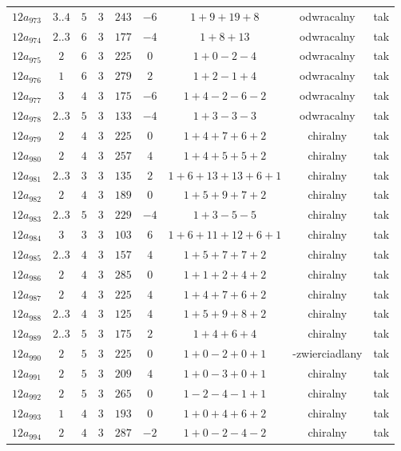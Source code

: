 \begin{longtable}{ccccccccc}
$12a_{973}$ & $3..4$ & $5$ & $3$ & $243$ & $-6$ & $1+9+19+8$ & odwracalny & tak \\
$12a_{974}$ & $2..3$ & $6$ & $3$ & $177$ & $-4$ & $1+8+13$ & odwracalny & tak \\
$12a_{975}$ & $2$ & $6$ & $3$ & $225$ & $0$ & $1+0-2-4$ & odwracalny & tak \\
$12a_{976}$ & $1$ & $6$ & $3$ & $279$ & $2$ & $1+2-1+4$ & odwracalny & tak \\
$12a_{977}$ & $3$ & $4$ & $3$ & $175$ & $-6$ & $1+4-2-6-2$ & odwracalny & tak \\
$12a_{978}$ & $2..3$ & $5$ & $3$ & $133$ & $-4$ & $1+3-3-3$ & odwracalny & tak \\
$12a_{979}$ & $2$ & $4$ & $3$ & $225$ & $0$ & $1+4+7+6+2$ & chiralny & tak \\
$12a_{980}$ & $2$ & $4$ & $3$ & $257$ & $4$ & $1+4+5+5+2$ & chiralny & tak \\
$12a_{981}$ & $2..3$ & $3$ & $3$ & $135$ & $2$ & $1+6+13+13+6+1$ & chiralny & tak \\
$12a_{982}$ & $2$ & $4$ & $3$ & $189$ & $0$ & $1+5+9+7+2$ & chiralny & tak \\
$12a_{983}$ & $2..3$ & $5$ & $3$ & $229$ & $-4$ & $1+3-5-5$ & chiralny & tak \\
$12a_{984}$ & $3$ & $3$ & $3$ & $103$ & $6$ & $1+6+11+12+6+1$ & chiralny & tak \\
$12a_{985}$ & $2..3$ & $4$ & $3$ & $157$ & $4$ & $1+5+7+7+2$ & chiralny & tak \\
$12a_{986}$ & $2$ & $4$ & $3$ & $285$ & $0$ & $1+1+2+4+2$ & chiralny & tak \\
$12a_{987}$ & $2$ & $4$ & $3$ & $225$ & $4$ & $1+4+7+6+2$ & chiralny & tak \\
$12a_{988}$ & $2..3$ & $4$ & $3$ & $125$ & $4$ & $1+5+9+8+2$ & chiralny & tak \\
$12a_{989}$ & $2..3$ & $5$ & $3$ & $175$ & $2$ & $1+4+6+4$ & chiralny & tak \\
$12a_{990}$ & $2$ & $5$ & $3$ & $225$ & $0$ & $1+0-2+0+1$ & -zwierciadlany & tak \\
$12a_{991}$ & $2$ & $5$ & $3$ & $209$ & $4$ & $1+0-3+0+1$ & chiralny & tak \\
$12a_{992}$ & $2$ & $5$ & $3$ & $265$ & $0$ & $1-2-4-1+1$ & chiralny & tak \\
$12a_{993}$ & $1$ & $4$ & $3$ & $193$ & $0$ & $1+0+4+6+2$ & chiralny & tak \\
$12a_{994}$ & $2$ & $4$ & $3$ & $287$ & $-2$ & $1+0-2-4-2$ & chiralny & tak \\

\end{longtable}
